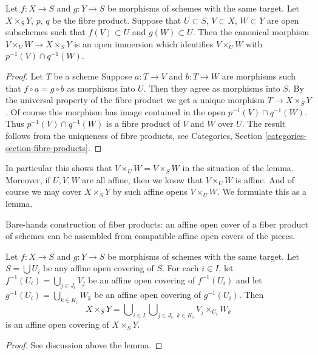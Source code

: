 \begin{lemma}
\label{lemma-open-fibre-product}
Let $f : X \to S$ and $g : Y \to S$ be morphisms of schemes
with the same target. Let $X \times_S Y$, $p$, $q$ be the fibre product.
Suppose that $U \subset S$,
$V \subset X$, $W \subset Y$ are open subschemes
such that $f(V) \subset U$ and $g(W) \subset U$.
Then the canonical morphism
$V \times_U W \to X \times_S Y$ is an open immersion
which identifies $V \times_U W$ with $p^{-1}(V) \cap q^{-1}(W)$.
\end{lemma}

\begin{proof}
Let $T$ be a scheme
Suppose $a : T \to V$ and $b : T \to W$ are morphisms
such that $f \circ a = g \circ b$ as morphisms into $U$.
Then they agree as morphisms into $S$.
By the universal property of the fibre product we get
a unique morphism $T \to X \times_S Y$. Of course this morphism
has image contained in the open $p^{-1}(V) \cap q^{-1}(W)$.
Thus $p^{-1}(V) \cap q^{-1}(W)$ is a fibre product of
$V$ and $W$ over $U$. The result follows from the uniqueness
of fibre products, see Categories, Section
\ref{categories-section-fibre-products}.
\end{proof}

\noindent
In particular this shows that $V \times_U W = V \times_S W$
in the situation of the lemma. Moreover, if $U, V, W$ are all
affine, then we know that $V \times_U W$ is affine. And of course
we may cover $X \times_S Y$ by such affine opens $V \times_U W$.
We formulate this as a lemma.

\begin{lemma}
\label{lemma-affine-covering-fibre-product}
\begin{slogan}
Bare-hands construction of fiber products: an affine open cover of a
fiber product of schemes can be assembled from compatible
affine open covers of the pieces.
\end{slogan}
Let $f : X \to S$ and $g : Y \to S$ be morphisms of schemes
with the same target. Let $S = \bigcup U_i$ be any affine open
covering of $S$. For each $i \in I$, let
$f^{-1}(U_i) = \bigcup_{j \in J_i} V_j$ be an affine open covering
of $f^{-1}(U_i)$ and let
$g^{-1}(U_i) = \bigcup_{k \in K_i} W_k$ be an affine open covering
of $g^{-1}(U_i)$. Then
$$
X \times_S Y =
\bigcup\nolimits_{i \in I}
\bigcup\nolimits_{j \in J_i, \ k \in K_i}
V_j \times_{U_i} W_k
$$
is an affine open covering of $X \times_S Y$.
\end{lemma}

\begin{proof}
See discussion above the lemma.
\end{proof}

